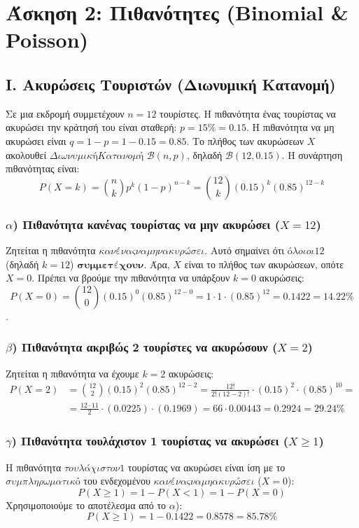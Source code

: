\documentclass[11pt,a4paper]{article}
\begin{document}
\section*{Άσκηση 2: Πιθανότητες (Binomial \& Poisson)}

\subsection*{Ι. Ακυρώσεις Τουριστών (Διωνυμική Κατανομή)}

Σε μια εκδρομή συμμετέχουν $n=12$ τουρίστες. Η πιθανότητα ένας τουρίστας να ακυρώσει την κράτησή του είναι σταθερή: $p = 15\% = 0.15$.
Η πιθανότητα να μη ακυρώσει είναι $q = 1 - p = 1 - 0.15 = 0.85$.
Το πλήθος των ακυρώσεων $X$ ακολουθεί ${Διωνυμική Κατανομή}$ $\mathcal{B}(n, p)$, δηλαδή $\mathcal{B}(12, 0.15)$.
Η συνάρτηση πιθανότητας είναι:
$$P(X=k) = \binom{n}{k} p^k (1-p)^{n-k} = \binom{12}{k} (0.15)^k (0.85)^{12-k}$$

\subsubsection*{$\alpha$) Πιθανότητα κανένας τουρίστας να μην ακυρώσει ($X=12$)}
Ζητείται η πιθανότητα ${κανένας να μην ακυρώσει}$. Αυτό σημαίνει ότι ${όλοι οι 12}$ (δηλαδή $k=12$) $\textbf{συμμετέχουν}$. Άρα, $X$ είναι το πλήθος των ακυρώσεων, οπότε $X=0$.
Πρέπει να βρούμε την πιθανότητα να υπάρξουν $k=0$ ακυρώσεις:
$$P(X=0) = \binom{12}{0} (0.15)^0 (0.85)^{12-0} = 1 \cdot 1 \cdot (0.85)^{12} = 0.1422=14.22\%$$.
\subsubsection*{$\beta$) Πιθανότητα ακριβώς 2 τουρίστες να ακυρώσουν ($X=2$)}
Ζητείται η πιθανότητα να έχουμε $k=2$ ακυρώσεις:
\begin{align*}
P(X=2) &= \binom{12}{2} (0.15)^2 (0.85)^{12-2} = \frac{12!}{2!(12-2)!} \cdot (0.15)^2 \cdot (0.85)^{10} =\\&= \frac{12 \cdot 11}{2} \cdot (0.0225) \cdot (0.1969) = 66 \cdot 0.00443 = 0.2924=29.24\%
\end{align*}
\subsubsection*{$\gamma$) Πιθανότητα τουλάχιστον 1 τουρίστας να ακυρώσει ($X \ge 1$)}
Η πιθανότητα ${τουλάχιστον 1}$ τουρίστας να ακυρώσει είναι ίση με το ${συμπληρωματικό}$ του ενδεχομένου ${κανένας να μη ακυρώσει}$ ($X=0$):
$$P(X \ge 1) = 1 - P(X < 1) = 1 - P(X=0)$$
Χρησιμοποιούμε το αποτέλεσμα από το $\alpha$):
$$P(X \ge 1) = 1 - 0.1422= 0.8578=85.78\%$$
\end{document}
